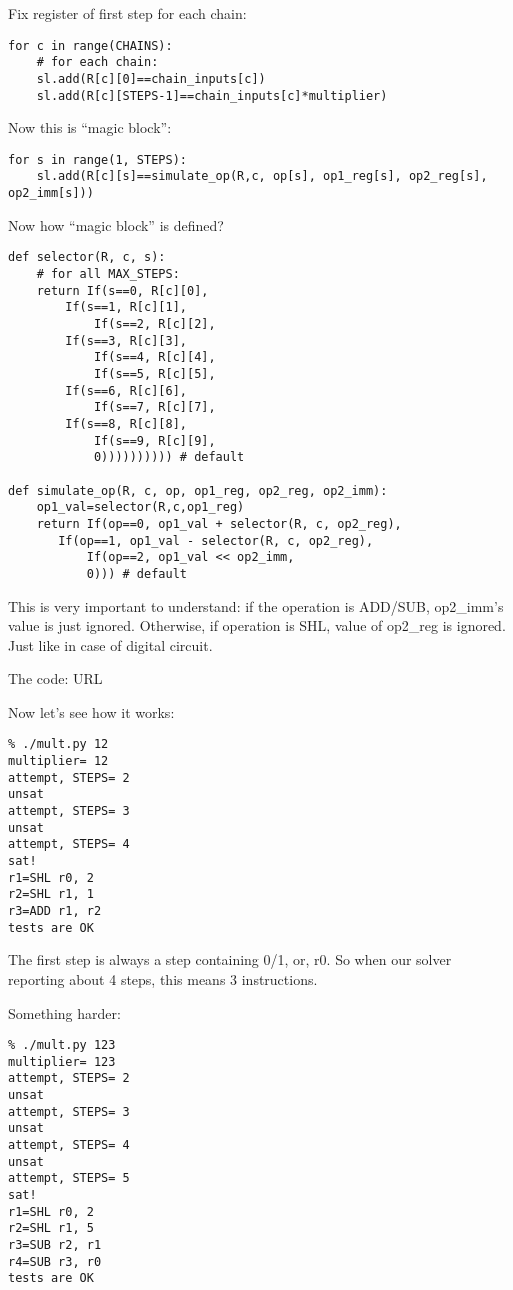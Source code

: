 Fix register of first step for each chain:

\begin{lstlisting}
for c in range(CHAINS):
    # for each chain:
    sl.add(R[c][0]==chain_inputs[c])
    sl.add(R[c][STEPS-1]==chain_inputs[c]*multiplier)
\end{lstlisting}

Now this is ``magic block'':

\begin{lstlisting}
for s in range(1, STEPS):
    sl.add(R[c][s]==simulate_op(R,c, op[s], op1_reg[s], op2_reg[s], op2_imm[s]))
\end{lstlisting}

Now how ``magic block'' is defined?

\begin{lstlisting}
def selector(R, c, s):
    # for all MAX_STEPS:
    return If(s==0, R[c][0],
	    If(s==1, R[c][1],
            If(s==2, R[c][2],
	    If(s==3, R[c][3],
            If(s==4, R[c][4],
            If(s==5, R[c][5],
	    If(s==6, R[c][6],
            If(s==7, R[c][7],
	    If(s==8, R[c][8],
            If(s==9, R[c][9],
	        0)))))))))) # default

def simulate_op(R, c, op, op1_reg, op2_reg, op2_imm):
    op1_val=selector(R,c,op1_reg)
    return If(op==0, op1_val + selector(R, c, op2_reg),
	   If(op==1, op1_val - selector(R, c, op2_reg),
           If(op==2, op1_val << op2_imm,
	       0))) # default
\end{lstlisting}

This is very important to understand: if the operation is ADD/SUB, op2\_imm's value is just ignored.
Otherwise, if operation is SHL, value of op2\_reg is ignored.
Just like in case of digital circuit.

The code: URL

Now let's see how it works:

\begin{lstlisting}
% ./mult.py 12
multiplier= 12
attempt, STEPS= 2
unsat
attempt, STEPS= 3
unsat
attempt, STEPS= 4
sat!
r1=SHL r0, 2
r2=SHL r1, 1
r3=ADD r1, r2
tests are OK
\end{lstlisting}

The first step is always a step containing 0/1, or, r0.
So when our solver reporting about 4 steps, this means 3 instructions.

Something harder:

\begin{lstlisting}
% ./mult.py 123
multiplier= 123
attempt, STEPS= 2
unsat
attempt, STEPS= 3
unsat
attempt, STEPS= 4
unsat
attempt, STEPS= 5
sat!
r1=SHL r0, 2
r2=SHL r1, 5
r3=SUB r2, r1
r4=SUB r3, r0
tests are OK
\end{lstlisting}

